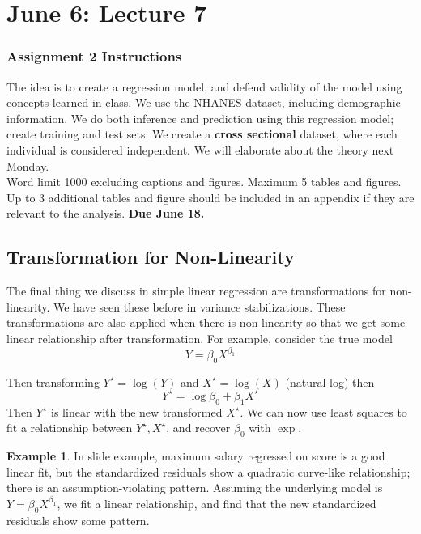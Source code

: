 \documentclass[12pt, a4paper]{article}
\theoremstyle{definition}
\newtheorem{example}{Example}
\begin{document}
  	\section{June 6: Lecture 7}
  	
  	\subsubsection{Assignment 2 Instructions}
  	The idea is to create a regression model, and defend validity of the model using concepts learned in class. We use the NHANES dataset, including demographic information. We do both inference and prediction using this regression model; create training and test sets. We create a {\bf cross sectional} dataset, where each individual is considered independent. We will elaborate about the theory next Monday. \\
  	
  	Word limit 1000 excluding captions and figures. Maximum 5 tables and figures. Up to 3 additional tables and figure should be included in an appendix if they are relevant to the analysis. {\bf Due June 18.}
  	
  	\subsection{Transformation for Non-Linearity}
  	
  	The final thing we discuss in simple linear regression are transformations for non-linearity. We have seen these before in variance stabilizations. These transformations are also applied when there is non-linearity so that we get some linear relationship after transformation. For example, consider the true model
  	$$
  		Y = \beta_0 X^{\beta_1}
  	$$
  	
  	Then transforming $Y^\star = \log(Y)$ and $X^\star = \log(X)$ (natural log) then
  	$$
  		Y^\star = \log \beta_0 + \beta_1 X^\star
  	$$
  	Then $Y^\star$ is linear with the new transformed $X^\star$. We can now use least squares to fit a relationship between $Y^\star, X^\star$, and recover $\beta_0$ with $\exp$.
  	
  	\begin{example}
  		In slide example, maximum salary regressed on score is a good linear fit, but the standardized residuals show a quadratic curve-like relationship; there is an assumption-violating pattern. Assuming the underlying model is $Y = \beta_0 X^{\beta_1}$, we fit a linear relationship, and find that the new standardized residuals show some pattern.
  	\end{example}
  	
\end{document}
